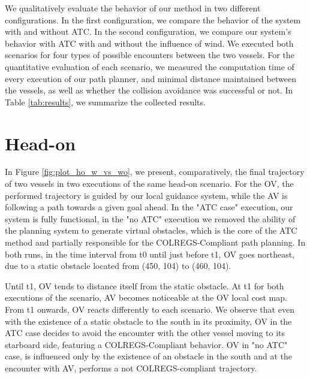         We qualitatively evaluate the behavior of our method in two different configurations. In the first configuration, we compare the behavior of the system with and without \ac{ATC}.  In the second configuration, we compare our system's behavior with \ac{ATC} with and without the influence of wind. We executed both scenarios for four types of possible encounters between the two vessels. For the quantitative evaluation of each scenario, we measured the computation time of every execution of our path planner, and minimal distance maintained between the vessels, as well as whether the collision avoidance was successful or not. In Table \ref{tab:results}, we summarize the collected results.
        
        \section{Head-on}

        
        In Figure \ref{fig:plot_ho_w_vs_wo}, we present, comparatively, the final trajectory of two vessels in two executions of the same head-on scenario. For the \ac{OV}, the performed trajectory is guided by our local guidance system, while the \ac{AV} is following a path towards a given goal ahead. In the "ATC case" execution, our system is fully functional, in the "no ATC" execution we removed the ability of the planning system to generate virtual obstacles, which is the core of the \ac{ATC} method and partially responsible for the \ac{COLREGS}-Compliant path planning. In both runs, in the time interval from t0 until just before t1, \ac{OV} goes northeast, due to a static obstacle located from (450, 104) to (460, 104). 
        
        Until t1, \ac{OV} tends to distance itself from the static obstacle. At t1 for both executions of the scenario, \ac{AV} becomes noticeable at the \ac{OV} local cost map. From t1 onwards, \ac{OV} reacts differently to each scenario. We observe that even with the existence of a static obstacle to the south in its proximity, \ac{OV} in the \ac{ATC} case decides to avoid the encounter with the other vessel moving to its starboard side, featuring a \ac{COLREGS}-Compliant behavior. \ac{OV} in "no ATC" case, is influenced only by the existence of an obstacle in the south and at the encounter with \ac{AV}, performs a not \ac{COLREGS}-compliant trajectory.
        
